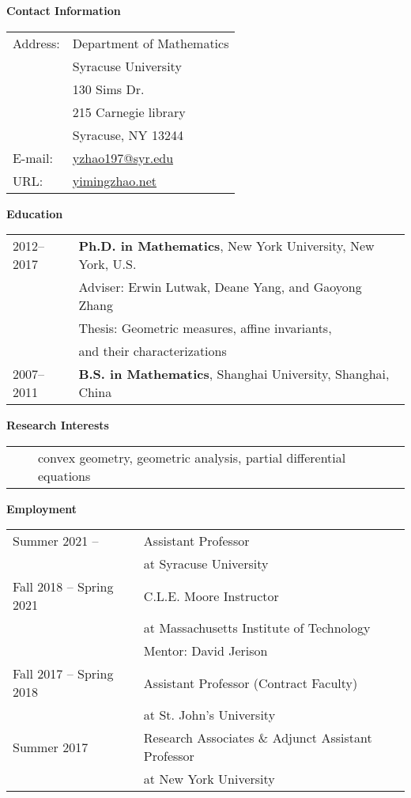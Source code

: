 \documentclass[12pt]{article}
\theoremstyle{plain} \numberwithin{equation}{section}
\theoremstyle{definition}
\begin{document}

\large{\textbf{Contact Information}}

\medskip

\begin{tabular}{ll}

Address: & Department of Mathematics\\
  & Syracuse University\\
  & 130 Sims Dr.\\
  & 215 Carnegie library \\
  & Syracuse, NY 13244\\
E-mail: & \href{mailto:yzhao197@syr.edu}{yzhao197@syr.edu}\\
URL: & \href{https://www.yimingzhao.net}{yimingzhao.net}\\

\end{tabular}

\bigskip

{\large\textbf{Education}}
\medskip

\begin{tabular}{ll}
2012--2017 & \textbf{Ph.D. in Mathematics}, New York University, New York, U.S.\\
& Adviser: Erwin Lutwak, Deane Yang, and Gaoyong Zhang\\
& Thesis: Geometric measures, affine invariants, \\
&\phantom{qweqwe}and their characterizations\\
2007--2011 & \textbf{B.S. in Mathematics}, Shanghai University, Shanghai, China\\
\end{tabular} \medskip


{\large\textbf{Research Interests}\\} \medskip
\begin{tabular}{lll}
&&convex geometry, geometric analysis, partial differential equations
\end{tabular} \medskip

{\large\textbf{Employment}}
\medskip

\begin{tabular}{ll}
Summer 2021 -- & Assistant Professor\\
&\phantom{qwewae} at Syracuse University\\

Fall 2018 --	 Spring 2021	& C.L.E. Moore Instructor\\
&\phantom{qwewae} at Massachusetts Institute of Technology\\
& Mentor: David Jerison\\
Fall 2017 -- Spring 2018 &  Assistant Professor (Contract Faculty)\\
 &\phantom{qwewae} at St. John's University\\
Summer 2017 & Research Associates \& Adjunct Assistant Professor\\
&\phantom{qwewae} at New York University\\
\end{tabular} \medskip
\end{document}
